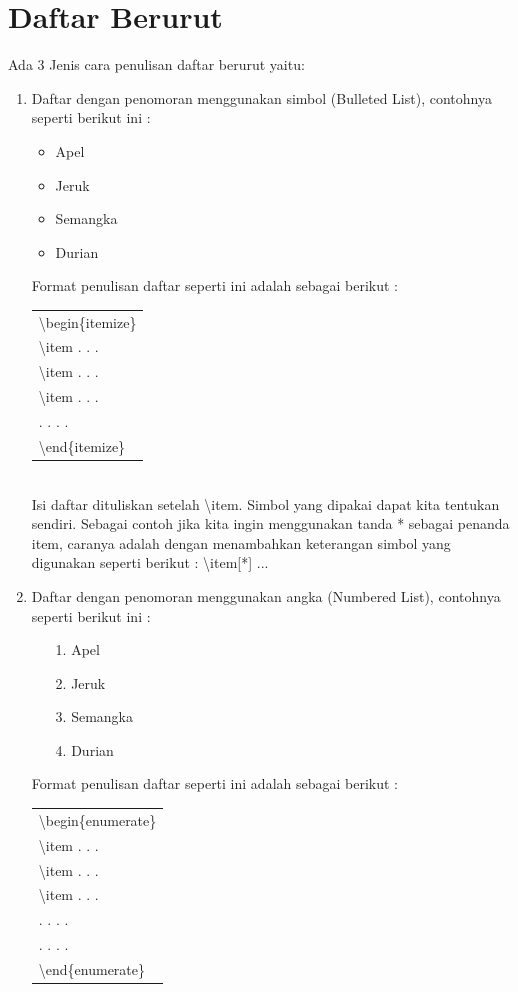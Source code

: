 \section{Daftar Berurut }
Ada 3 Jenis cara penulisan daftar berurut yaitu:
\begin{enumerate}
\item Daftar dengan penomoran menggunakan simbol (Bulleted List), contohnya seperti
berikut ini :
\begin{itemize}
\item Apel
\item Jeruk 
\item Semangka
\item Durian
\end{itemize}
Format penulisan daftar seperti ini adalah sebagai berikut :\\[0.5 cm]
\begin{tabular}{|p{12.5 cm}|}
\hline
\textbackslash begin\{itemize\}\\
\textbackslash item . . .\\
\textbackslash item . . .\\
\textbackslash item . . .\\
. . . .\\
\textbackslash end\{itemize\}\\

\hline
\end{tabular}\\[0.5 cm]
Isi daftar dituliskan setelah \textbackslash item. Simbol yang dipakai dapat kita tentukan sendiri.
Sebagai contoh jika kita ingin menggunakan tanda * sebagai penanda item, caranya adalah dengan menambahkan keterangan simbol yang digunakan seperti berikut : \textbackslash item[*] ...
\item Daftar dengan penomoran menggunakan angka (Numbered List), contohnya seperti berikut ini :\\
\begin{enumerate}
\setlength{\itemindent}{-0.1 in}
\setlength\itemsep{0 em}
\item[1.] Apel
\item[2.] Jeruk 
\item[3.] Semangka
\item[4.] Durian
\end{enumerate}
Format penulisan daftar seperti ini adalah sebagai berikut :\\[0.5 cm]
\begin{tabular}{|p{12.5 cm}|}
\hline
\textbackslash begin\{enumerate\}\\
\textbackslash item . . .\\
\textbackslash item . . .\\
\textbackslash item . . .\\
. . . .\\
. . . .\\
\textbackslash end\{enumerate\}\\


\end{tabular}
\end{enumerate}
